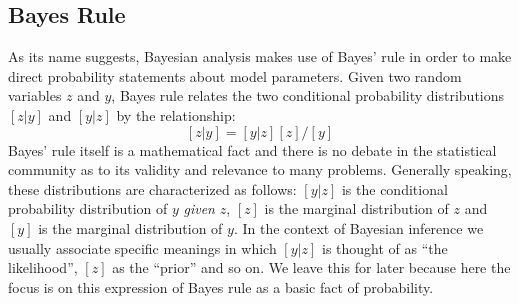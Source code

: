 \subsection{Bayes Rule}

As its name suggests, Bayesian analysis makes use of Bayes' rule in
order to make direct probability statements about model
parameters. Given two random variables $z$ and $y$, Bayes rule relates
the two conditional probability distributions $[z|y]$ and $[y|z]$ by
the relationship:
\[
[z|y] = [y|z][z]/[y]
\]
Bayes' rule itself is a mathematical fact and there is no debate in
the statistical community as to its validity and relevance to many
problems. Generally speaking, these distributions are characterized as
follows: $[y|z]$ is the conditional probability distribution of $y$
{\it given} $z$, $[z]$ is the marginal distribution of $z$ and $[y]$
is the marginal distribution of $y$. In the context of Bayesian
inference we usually associate specific meanings in which $[y|z]$ is
thought of as ``the likelihood'', $[z]$ as the ``prior'' and so on. We
leave this for later because here the focus is on this expression of
Bayes rule as a basic fact of probability.

